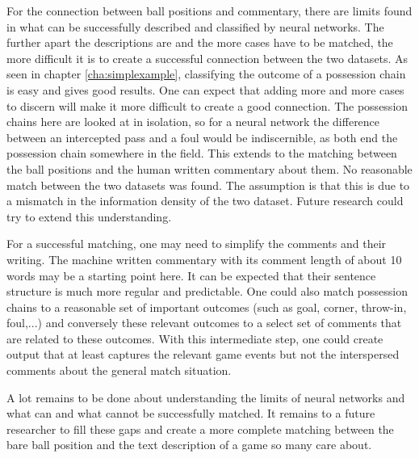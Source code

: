 \documentclass[10pt, a4paper]{UUThesisTemplate}
\begin{document}
For the connection between ball positions and commentary, there are limits found in what can be successfully described and classified by neural networks. The further apart the descriptions are and the more cases have to be matched, the more difficult it is to create a successful connection between the two datasets. As seen in chapter \ref{cha:simplexample}, classifying the outcome of a possession chain is easy and gives good results. One can expect that adding more and more cases to discern will make it more difficult to create a good connection. The possession chains here are looked at in isolation, so for a neural network the difference between an intercepted pass and a foul would be indiscernible, as both end the possession chain somewhere in the field. This extends to the matching between the ball positions and the human written commentary about them. No reasonable match between the two datasets was found. The assumption is that this is due to a mismatch in the information density of the two dataset. Future research could try to extend this understanding.

For a successful matching, one may need to simplify the comments and their writing. The machine written commentary with its comment length of about 10 words may be a starting point here. It can be expected that their sentence structure is much more regular and predictable. One could also match possession chains to a reasonable set of important outcomes (such as goal, corner, throw-in, foul,...) and conversely these relevant outcomes to a select set of comments that are related to these outcomes. With this intermediate step, one could create output that at least captures the relevant game events but not the interspersed comments about the general match situation.

A lot remains to be done about understanding the limits of neural networks and what can and what cannot be successfully matched. It remains to a future researcher to fill these gaps and create a more complete matching between the bare ball position and the text description of a game so many care about.\cleardoublepage


\backmatter
\end{document}
